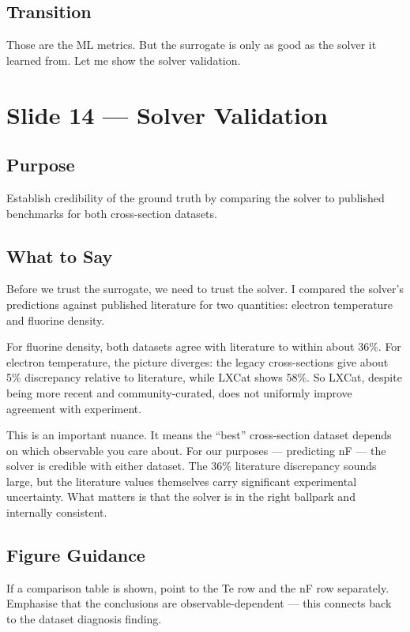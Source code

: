 \documentclass[12pt,a4paper]{article}
\begin{document}
\subsection*{Transition}
Those are the ML metrics. But the surrogate is only as good as the
solver it learned from. Let me show the solver validation.

\clearpage

\section{Slide 14 --- Solver Validation}
\label{sec:slide14}

\subsection*{Purpose}
Establish credibility of the ground truth by comparing the solver
to published benchmarks for both cross-section datasets.

\subsection*{What to Say}

Before we trust the surrogate, we need to trust the solver. I
compared the solver's predictions against published literature for
two quantities: electron temperature and fluorine density.

For fluorine density, both datasets agree with literature to within
about 36\%. For electron temperature, the picture diverges: the
legacy cross-sections give about 5\% discrepancy relative to
literature, while LXCat shows 58\%. So LXCat, despite being more
recent and community-curated, does not uniformly improve agreement
with experiment.

This is an important nuance. It means the ``best'' cross-section
dataset depends on which observable you care about. For our
purposes --- predicting nF --- the solver is credible with either
dataset. The 36\% literature discrepancy sounds large, but the
literature values themselves carry significant experimental
uncertainty. What matters is that the solver is in the right
ballpark and internally consistent.

\subsection*{Figure Guidance}
If a comparison table is shown, point to the Te row and the nF row
separately. Emphasise that the conclusions are
observable-dependent --- this connects back to the dataset diagnosis
finding.
\end{document}
